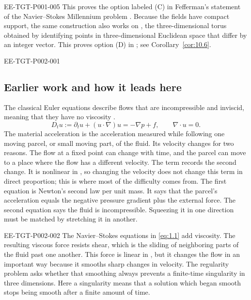 \begin{EESegment}{EE-TGT-P001-005}
This proves the option labeled (C) in Fefferman's statement of the Navier--Stokes Millennium
problem \cite{ref-13}. Because the fields have compact support, the same construction also works
on , the three-dimensional torus obtained
by identifying points in three-dimensional Euclidean space that differ by an integer vector. This proves option (D)
in \cite{ref-13}; see Corollary~\ref{cor:10.6}.
\end{EESegment}

%
\begin{EESegment}{EE-TGT-P002-001}
\subsection{Earlier work and how it leads here}\label{sec:1.1}

The classical Euler equations describe flows that are incompressible and inviscid, meaning that
they have no viscosity \cite{ref-12}.
\begin{equation}
  D_tu:=\partial_tu+(u\cdot\nabla)u=-\nabla p+f,
  \qquad \nabla\cdot u=0.
  \tag{1.2}\label{eq:1.2}
\end{equation}
The material acceleration  is the acceleration measured while following
one moving parcel, or small moving part, of the fluid. Its velocity changes for two reasons. The flow at a fixed point can change
with time, and the parcel can move to a place where the flow has a different velocity. The term
 records the second change. It is nonlinear in
, so changing the velocity does not change this term in direct proportion;
this is where most of the difficulty comes from. The first equation is Newton's second law per
unit mass. It says that the parcel's acceleration equals the negative pressure gradient plus the
external force. The second equation says the fluid is incompressible. Squeezing it in one
direction must be matched by stretching it in another.
\end{EESegment}

\begin{EESegment}{EE-TGT-P002-002}
The Navier--Stokes equations \cite{ref-18,ref-21} in \eqref{eq:1.1} add viscosity. The resulting
viscous force resists shear, which is the sliding of neighboring parts of the fluid past one
another. This force is linear in , but it changes the flow in an important
way because it smooths sharp changes in velocity. The regularity problem asks whether that
smoothing always prevents a finite-time singularity in three dimensions. Here a singularity
means that a solution which began smooth stops being smooth after a finite amount of time.
\end{EESegment}

